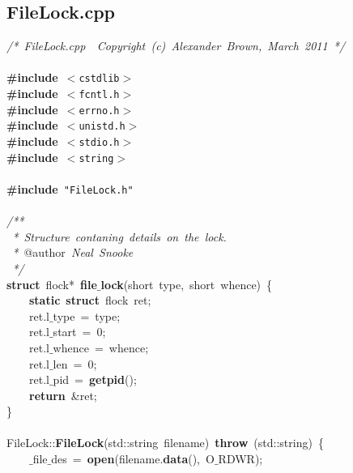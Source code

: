 \clearpage
\normalsize
\rmfamily
\subsection{FileLock.cpp}
\scriptsize
\sffamily
\noindent
\mbox{}\textit{/*\ FileLock.cpp\ \ Copyright\ (c)\ Alexander\ Brown,\ March\ 2011\ */} \\
\mbox{} \\
\mbox{}\textbf{\#include}\ \texttt{$<$cstdlib$>$} \\
\mbox{}\textbf{\#include}\ \texttt{$<$fcntl.h$>$} \\
\mbox{}\textbf{\#include}\ \texttt{$<$errno.h$>$} \\
\mbox{}\textbf{\#include}\ \texttt{$<$unistd.h$>$} \\
\mbox{}\textbf{\#include}\ \texttt{$<$stdio.h$>$} \\
\mbox{}\textbf{\#include}\ \texttt{$<$string$>$} \\
\mbox{} \\
\mbox{}\textbf{\#include}\ \texttt{"{}FileLock.h"{}} \\
\mbox{} \\
\mbox{}\textit{/**} \\
\mbox{}\textit{\ *\ Structure\ contaning\ details\ on\ the\ lock.} \\
\mbox{}\textit{\ *\ }@author\textit{\ Neal\ Snooke} \\
\mbox{}\textit{\ */} \\
\mbox{}\textbf{struct}\ flock*\ \textbf{file$\_$lock}(short\ type,\ short\ whence)\ \{ \\
\mbox{}\ \ \ \ \textbf{static}\ \textbf{struct}\ flock\ ret; \\
\mbox{}\ \ \ \ ret.l$\_$type\ =\ type; \\
\mbox{}\ \ \ \ ret.l$\_$start\ =\ 0; \\
\mbox{}\ \ \ \ ret.l$\_$whence\ =\ whence; \\
\mbox{}\ \ \ \ ret.l$\_$len\ =\ 0; \\
\mbox{}\ \ \ \ ret.l$\_$pid\ =\ \textbf{getpid}(); \\
\mbox{}\ \ \ \ \textbf{return}\ \&ret; \\
\mbox{}\} \\
\mbox{} \\
\mbox{}FileLock::\textbf{FileLock}(std::string\ filename)\ \textbf{throw}\ (std::string)\ \{ \\
\mbox{}\ \ \ \ $\_$file$\_$des\ =\ \textbf{open}(filename.\textbf{data}(),\ O$\_$RDWR); \\
